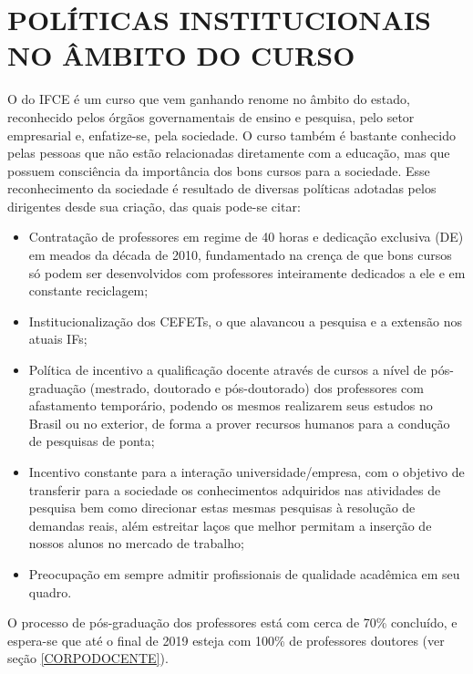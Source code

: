 \section{POLÍTICAS INSTITUCIONAIS NO ÂMBITO DO CURSO}

O \NOMECURSO do IFCE é um curso que vem ganhando renome no âmbito do estado, reconhecido pelos órgãos governamentais de ensino e pesquisa, pelo setor empresarial e, enfatize-se, pela sociedade. O curso também é bastante conhecido pelas pessoas que não estão relacionadas diretamente com a educação, mas que possuem consciência da importância dos bons cursos para a sociedade. Esse reconhecimento da sociedade é resultado de diversas políticas adotadas pelos dirigentes desde sua criação, das quais pode-se citar:

\begin{itemize}
	\item Contratação de professores em regime de 40 horas e dedicação exclusiva (DE) em meados da década de 2010, fundamentado na crença de que bons cursos só podem ser desenvolvidos com professores inteiramente dedicados a ele e em constante reciclagem;
	
	\item Institucionalização dos CEFETs, o que alavancou a pesquisa e a extensão nos atuais IFs;
	
	\item Política de incentivo a qualificação docente através de cursos a nível de pós-graduação (mestrado, doutorado e pós-doutorado) dos professores com afastamento temporário, podendo os mesmos realizarem seus estudos no Brasil ou no exterior, de forma a prover recursos humanos para a condução de pesquisas de ponta;
	
	\item Incentivo constante para a interação universidade/empresa, com o objetivo de transferir para a sociedade os conhecimentos adquiridos nas atividades de pesquisa bem como direcionar estas mesmas pesquisas à resolução de demandas reais, além estreitar laços que melhor permitam a inserção de nossos alunos no mercado de trabalho;
	
	\item Preocupação em sempre admitir profissionais de qualidade acadêmica em seu quadro.
\end{itemize}

O processo de pós-graduação dos professores está com cerca de 70\% concluído, e espera-se que até o final de 2019 esteja com 100\% de professores doutores (ver seção \ref{CORPODOCENTE}).

